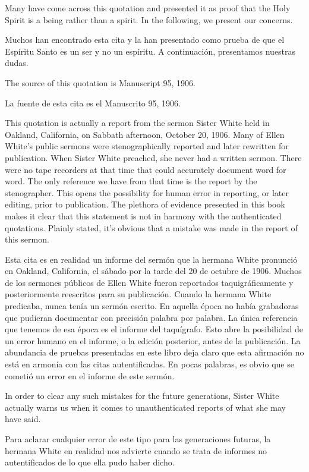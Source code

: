 Many have come across this quotation and presented it as proof that the Holy Spirit is a being rather than a spirit. In the following, we present our concerns.


Muchos han encontrado esta cita y la han presentado como prueba de que el Espíritu Santo es un ser y no un espíritu. A continuación, presentamos nuestras dudas.


The source of this quotation is Manuscript 95, 1906.


La fuente de esta cita es el Manuscrito 95, 1906.


This quotation is actually a report from the sermon Sister White held in Oakland, California, on Sabbath afternoon, October 20, 1906. Many of Ellen White’s public sermons were stenographically reported and later rewritten for publication. When Sister White preached, she never had a written sermon. There were no tape recorders at that time that could accurately document word for word. The only reference we have from that time is the report by the stenographer. This opens the possibility for human error in reporting, or later editing, prior to publication. The plethora of evidence presented in this book makes it clear that this statement is not in harmony with the authenticated quotations. Plainly stated, it’s obvious that a mistake was made in the report of this sermon.


Esta cita es en realidad un informe del sermón que la hermana White pronunció en Oakland, California, el sábado por la tarde del 20 de octubre de 1906. Muchos de los sermones públicos de Ellen White fueron reportados taquigráficamente y posteriormente reescritos para su publicación. Cuando la hermana White predicaba, nunca tenía un sermón escrito. En aquella época no había grabadoras que pudieran documentar con precisión palabra por palabra. La única referencia que tenemos de esa época es el informe del taquígrafo. Esto abre la posibilidad de un error humano en el informe, o la edición posterior, antes de la publicación. La abundancia de pruebas presentadas en este libro deja claro que esta afirmación no está en armonía con las citas autentificadas. En pocas palabras, es obvio que se cometió un error en el informe de este sermón.


In order to clear any such mistakes for the future generations, Sister White actually warns us when it comes to unauthenticated reports of what she may have said.


Para aclarar cualquier error de este tipo para las generaciones futuras, la hermana White en realidad nos advierte cuando se trata de informes no autentificados de lo que ella pudo haber dicho.


